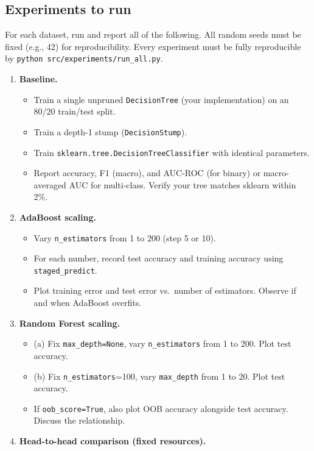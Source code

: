 \documentclass[11pt,a4paper]{article}
\begin{document}
\subsection{Experiments to run}
For each dataset, run and report all of the following. All random seeds must be fixed (e.g., 42) for reproducibility. Every experiment must be fully reproducible by \texttt{python src/experiments/run\_all.py}.
\begin{enumerate}[topsep=2pt,itemsep=4pt,leftmargin=2.2em]
  \item \textbf{Baseline.}
    \begin{itemize}
      \item Train a single unpruned \texttt{DecisionTree} (your implementation) on an 80/20 train/test split.
      \item Train a depth-1 stump (\texttt{DecisionStump}).
      \item Train \texttt{sklearn.tree.DecisionTreeClassifier} with identical parameters.
      \item Report accuracy, F1 (macro), and AUC-ROC (for binary) or macro-averaged AUC for multi-class. Verify your tree matches sklearn within 2\%.
    \end{itemize}
  \item \textbf{AdaBoost scaling.}
    \begin{itemize}
      \item Vary \texttt{n\_estimators} from 1 to 200 (step 5 or 10).
      \item For each number, record test accuracy and training accuracy using \texttt{staged\_predict}.
      \item Plot training error and test error vs.\ number of estimators. Observe if and when AdaBoost overfits.
    \end{itemize}
  \item \textbf{Random Forest scaling.}
    \begin{itemize}
      \item (a) Fix \texttt{max\_depth=None}, vary \texttt{n\_estimators} from 1 to 200. Plot test accuracy.
      \item (b) Fix \texttt{n\_estimators}=100, vary \texttt{max\_depth} from 1 to 20. Plot test accuracy.
      \item If \texttt{oob\_score=True}, also plot OOB accuracy alongside test accuracy. Discuss the relationship.
    \end{itemize}
  \item \textbf{Head-to-head comparison (fixed resources).}

\end{enumerate}
\end{document}
